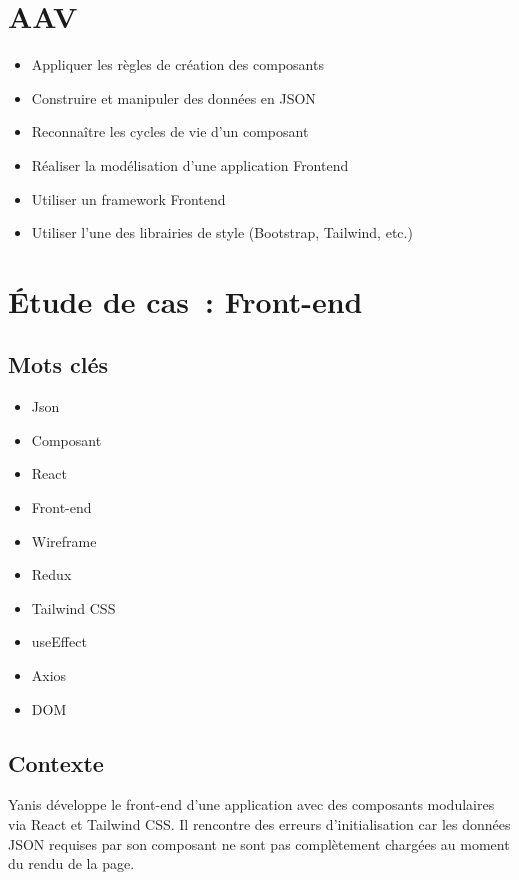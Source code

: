 \newpage

\section*{AAV}
\begin{itemize}
	\item [5] Appliquer les règles de création des composants
	\item [6] Construire et manipuler des données en JSON
	\item [2] Reconnaître les cycles de vie d'un composant
	\item [3] Réaliser la modélisation d'une application Frontend
	\item [5] Utiliser un framework Frontend
	\item [5] Utiliser l’une des librairies de style (Bootstrap, Tailwind, etc.)
\end{itemize}

\newpage

\section*{Étude de cas~: Front-end}

\subsection*{Mots clés}
{}
\begin{itemize}
	\item Json
	\item Composant
	\item React
	\item Front-end
	\item Wireframe
	\item Redux
	\item Tailwind CSS
	\item useEffect
	\item Axios
	\item DOM
\end{itemize}

\subsection*{Contexte}
{}
\noindent Yanis développe le front-end d'une application avec des composants modulaires via React et Tailwind CSS. Il rencontre des erreurs d'initialisation car les données JSON requises par son composant ne sont pas complètement chargées au moment du rendu de la page.

